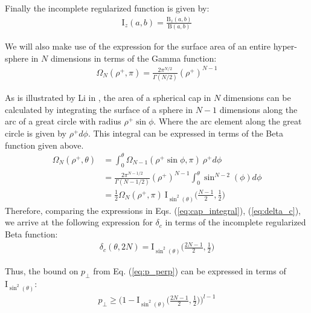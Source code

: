 Finally the incomplete regularized function is given by:
\begin{equation}\label{eq:beta_inc_reg}
    \begin{aligned}
        \text{I}_z(a,b) = \frac{\text{B}_z(a,b)}{\text{B}(a,b)}
    \end{aligned}
\end{equation}

We will also make use of the expression for the surface area of an entire hyper-sphere in $N$ dimensions in terms of the Gamma function:
\begin{equation}\label{eq:omega_gamma}
    \begin{aligned}
        \Omega_N(\rho^+,\pi) = \frac{2\pi^{N/2}}{\Gamma(N/2)}(\rho^+)^{N-1}
    \end{aligned}
\end{equation}

As is illustrated by Li in \cite{Li2011}, the area of a spherical cap in $N$ dimensions can be calculated by integrating the surface of a sphere in $N-1$ dimensions along the arc of a great circle with radius $\rho^+\sin\phi$. Where the arc element along the great circle is given by $\rho^+d\phi$. This integral can be expressed in terms of the Beta function given above.
\begin{equation}\label{eq:cap_integral}
    \begin{aligned}
        \Omega_N(\rho^+,\theta) &= \int_0^\theta \Omega_{N-1}(\rho^+\sin\phi,\pi)\ \rho^+d\phi\\
        &= \frac{2\pi^{N-1/2}}{\Gamma(N-1/2)}(\rho^+)^{N-1}  \int_0^\theta \sin^{N-2}(\phi)d\phi\\
        &= \frac{1}{2} \Omega_N(\rho^+,\pi)\  \text{I}_{\sin^2(\theta)}\bigg(\frac{N-1}{2},\frac{1}{2}\bigg)
    \end{aligned}
\end{equation}
Therefore, comparing the expressions in Eqs. (\ref{eq:cap_integral}), (\ref{eq:delta_c}), we arrive at the following expression for $\delta_c$ in terms of the incomplete regularized Beta function:
\begin{equation}\label{eq:delta_c_beta}
    \begin{aligned}
        \delta_c(\theta,2N) = \text{I}_{\sin^2(\theta)}\bigg(\frac{2N-1}{2},\frac{1}{2}\bigg)
    \end{aligned}
\end{equation}

Thus, the bound on $p_\perp$ from Eq. (\ref{eq:p_perp}) can be expressed in terms of $\text{I}_{\sin^2(\theta)}$:
\begin{equation}\label{eq:p_perp_beta}
    \begin{aligned}
        p_{\perp} \geq \bigg(1-\text{I}_{\sin^2(\theta)}\bigg(\frac{2N-1}{2},\frac{1}{2}\bigg)\bigg)^{l-1}
    \end{aligned}
\end{equation}